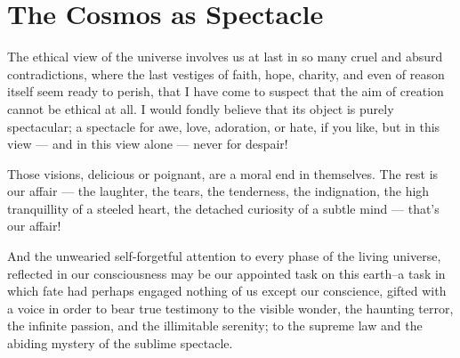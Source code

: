 \section{The Cosmos as Spectacle}

\begin{quotationx}
The ethical view of the universe involves us at last in so many cruel and absurd contradictions, where the last vestiges of faith, hope, charity, and even of reason itself seem ready to perish, that I have come to suspect that the aim of creation cannot be ethical at all. I would fondly believe that its object is purely spectacular; a spectacle for awe, love, adoration, or hate, if you like, but in this view --- and in this view alone --- never for despair!

Those visions, delicious or poignant, are a moral end in themselves. The rest is our affair --- the laughter, the tears, the tenderness, the indignation, the high tranquillity of a steeled heart, the detached curiosity of a subtle mind --- that's our affair!

And the unwearied self-forgetful attention to every phase of the living universe, reflected in our consciousness may be our appointed task on this earth--a task in which fate had perhaps engaged nothing of us except our conscience, gifted with a voice in order to bear true testimony to the visible wonder, the haunting terror, the infinite passion, and the illimitable serenity; to the supreme law and the abiding mystery of the sublime spectacle.
\end{quotationx}






